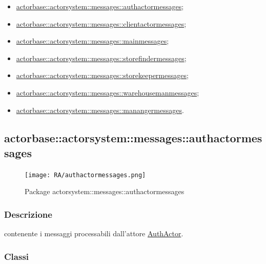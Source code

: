 \documentclass{scalatekids-article}
\begin{document}
\begin{itemize}
\item \hyperref[sec:actorbase::actorsystem::messages::authactormessages]{actorbase::actorsystem::messages::authactormessages};
\item \hyperref[sec:actorbase::actorsystem::messages::clientactormessages]{actorbase::actorsystem::messages::clientactormessages};
\item \hyperref[sec:actorbase::actorsystem::messages::mainmessages]{actorbase::actorsystem::messages::mainmessages};
\item \hyperref[sec:actorbase::actorsystem::messages::storefindermessages]{actorbase::actorsystem::messages::storefindermessages};
\item \hyperref[sec:actorbase::actorsystem::messages::storekeepermessages]{actorbase::actorsystem::messages::storekeepermessages};
\item \hyperref[sec:actorbase::actorsystem::messages::warehousemanmessages]{actorbase::actorsystem::messages::warehousemanmessages};
  \item \hyperref[sec:actorbase::actorsystem::messages::warehousemanmessages]{actorbase::actorsystem::messages::manangermessages}.
\end{itemize}

\subsection{actorbase::actorsystem::messages::authactormessages}
\label{sec:actorbase::actorsystem::messages::authactormessages}

\begin{figure}[H]
  \begin{center}
    \texttt{[image: RA/authactormessages.png]}
    \caption{Package actorsystem::messages::authactormessages}
  \end{center}
\end{figure}

\subsubsection{Descrizione}
 contenente i messaggi processabili dall'attore \hyperref[sec:actorbase::actorsystem::actors::authactor::AuthActor]{AuthActor}.

\subsubsection{Classi}
\end{document}
